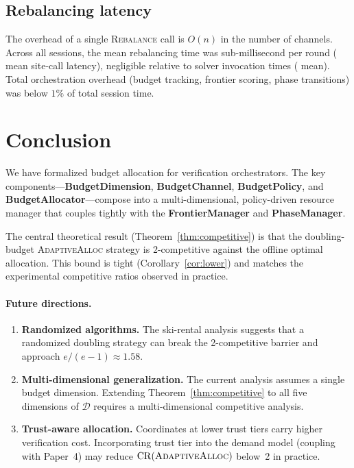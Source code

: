 \documentclass[11pt]{article}
\providecommand{\CR}{\mathrm{CR}}             %
\providecommand{\Rebal}{\textsc{Rebalance}}    %
\providecommand{\AdaptAlloc}{\textsc{AdaptiveAlloc}}   %
\begin{document}
\subsection{Rebalancing latency}

The overhead of a single \Rebal{} call is $O(n)$ in the number of
channels.  Across all sessions, the mean rebalancing time was
sub-millisecond per round (\subSiteMeanTime{} mean site-call latency),
negligible relative to solver invocation times (\expTimeMean{} mean).  Total orchestration overhead
(budget tracking, frontier scoring, phase transitions) was below
$1\%$ of total session time.

\section{Conclusion}\label{sec:conclusion}

We have formalized budget allocation for \JuGeo{} verification
orchestrators.  The key components---\textbf{BudgetDimension},
\textbf{BudgetChannel}, \textbf{BudgetPolicy}, and
\textbf{BudgetAllocator}---compose into a multi-dimensional,
policy-driven resource manager that couples tightly with the
\textbf{FrontierManager} and \textbf{PhaseManager}.

The central theoretical result (Theorem~\ref{thm:competitive}) is
that the doubling-budget \AdaptAlloc{} strategy is 2-competitive
against the offline optimal allocation.  This bound is tight
(Corollary~\ref{cor:lower}) and matches the experimental competitive
ratios observed in practice.

\paragraph{Future directions.}
\begin{enumerate}[label=(\roman*)]
  \item \textbf{Randomized algorithms.} The ski-rental analysis suggests
    that a randomized doubling strategy can break the 2-competitive
    barrier and approach $e/(e-1) \approx 1.58$.
  \item \textbf{Multi-dimensional generalization.}  The current analysis
    assumes a single budget dimension.  Extending Theorem~\ref{thm:competitive}
    to all five dimensions of $\mathcal{D}$ requires a multi-dimensional
    competitive analysis.
  \item \textbf{Trust-aware allocation.}  Coordinates at lower trust tiers
    carry higher verification cost.  Incorporating trust tier into the
    demand model (coupling with Paper~4) may reduce $\CR(\AdaptAlloc{})$ below~2
    in practice.
\end{enumerate}
\end{document}
